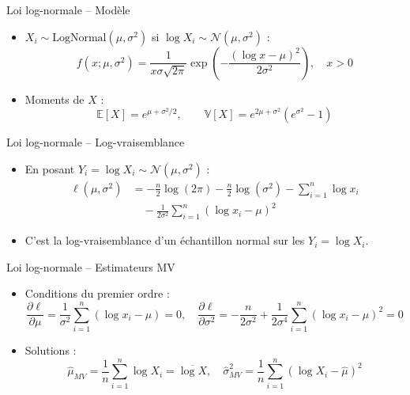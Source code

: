 \documentclass[11pt,aspectratio=169]{beamer}
\begin{document}
\begin{frame}{Loi log-normale -- Modèle}

\begin{itemize}

\item $X_i \sim \text{LogNormal}(\mu, \sigma^2)$ si $\log X_i \sim \mathcal{N}(\mu, \sigma^2)$ :
  \[
  f(x; \mu, \sigma^2) = \frac{1}{x\sigma\sqrt{2\pi}} \exp\left(-\frac{(\log x - \mu)^2}{2\sigma^2}\right), \quad x > 0
  \]

\item Moments de $X$ :
  \[
  \mathbb{E}[X] = e^{\mu + \sigma^2/2}, \qquad \mathbb{V}[X] = e^{2\mu + \sigma^2}\left(e^{\sigma^2} - 1\right)
  \]

\end{itemize}

\end{frame}

\begin{frame}{Loi log-normale -- Log-vraisemblance}

\begin{itemize}

\item En posant $Y_i = \log X_i \sim \mathcal{N}(\mu, \sigma^2)$ :
  \begin{align*}
  \ell(\mu, \sigma^2) &= -\frac{n}{2}\log(2\pi) - \frac{n}{2}\log(\sigma^2) - \sum_{i=1}^n \log x_i \\
  &\quad - \frac{1}{2\sigma^2}\sum_{i=1}^n (\log x_i - \mu)^2
  \end{align*}

\item C'est la log-vraisemblance d'un échantillon normal sur les $Y_i = \log X_i$.

\end{itemize}

\end{frame}

\begin{frame}{Loi log-normale -- Estimateurs MV}

\begin{itemize}

\item Conditions du premier ordre :
  \[
  \frac{\partial \ell}{\partial \mu} = \frac{1}{\sigma^2}\sum_{i=1}^n (\log x_i - \mu) = 0, \quad \frac{\partial \ell}{\partial \sigma^2} = -\frac{n}{2\sigma^2} + \frac{1}{2\sigma^4}\sum_{i=1}^n (\log x_i - \mu)^2 = 0
  \]

\item Solutions :
  \[
  \boxed{\hat{\mu}_{MV} = \frac{1}{n}\sum_{i=1}^n \log X_i = \overline{\log X}}, \quad \boxed{\hat{\sigma}^2_{MV} = \frac{1}{n}\sum_{i=1}^n (\log X_i - \hat{\mu})^2}
  \]

\end{itemize}

\end{frame}
\end{document}

